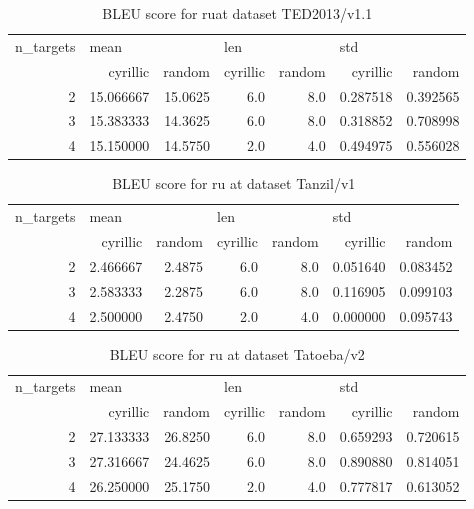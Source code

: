 \begin{table}[h]
\begin{tabular}{rrrrrrr}
\toprule
n\_targets & \multicolumn{2}{l}{mean} & \multicolumn{2}{l}{len} & \multicolumn{2}{l}{std} \\
          &   cyrillic &   random & cyrillic & random &  cyrillic &    random \\
\midrule
        2 &  15.066667 &  15.0625 &      6.0 &    8.0 &  0.287518 &  0.392565 \\
        3 &  15.383333 &  14.3625 &      6.0 &    8.0 &  0.318852 &  0.708998 \\
        4 &  15.150000 &  14.5750 &      2.0 &    4.0 &  0.494975 &  0.556028 \\
\bottomrule
\end{tabular}

\caption{BLEU score for  ruat dataset TED2013/v1.1 }
\label{ table:ru/TED2013/v1.1 }
\end{table}

\begin{table}[h]
\begin{tabular}{rrrrrrr}
\toprule
n\_targets & \multicolumn{2}{l}{mean} & \multicolumn{2}{l}{len} & \multicolumn{2}{l}{std} \\
          &  cyrillic &  random & cyrillic & random &  cyrillic &    random \\
\midrule
        2 &  2.466667 &  2.4875 &      6.0 &    8.0 &  0.051640 &  0.083452 \\
        3 &  2.583333 &  2.2875 &      6.0 &    8.0 &  0.116905 &  0.099103 \\
        4 &  2.500000 &  2.4750 &      2.0 &    4.0 &  0.000000 &  0.095743 \\
\bottomrule
\end{tabular}

\caption{BLEU score for  ru at dataset Tanzil/v1 }
\label{ table:ru/Tanzil/v1 }
\end{table}

\begin{table}[h]
\begin{tabular}{rrrrrrr}
\toprule
n\_targets & \multicolumn{2}{l}{mean} & \multicolumn{2}{l}{len} & \multicolumn{2}{l}{std} \\
          &   cyrillic &   random & cyrillic & random &  cyrillic &    random \\
\midrule
        2 &  27.133333 &  26.8250 &      6.0 &    8.0 &  0.659293 &  0.720615 \\
        3 &  27.316667 &  24.4625 &      6.0 &    8.0 &  0.890880 &  0.814051 \\
        4 &  26.250000 &  25.1750 &      2.0 &    4.0 &  0.777817 &  0.613052 \\
\bottomrule
\end{tabular}

\caption{BLEU score for  ru at dataset Tatoeba/v2 }
\label{ table:ru/Tatoeba/v2 }
\end{table}

